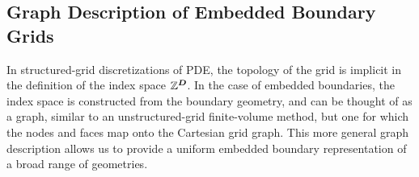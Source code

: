 \documentclass[12pt]{article}
\begin{document}

\subsection{Graph Description of Embedded Boundary Grids}

In structured-grid discretizations of PDE, the topology of the grid is implicit in the definition of the index space $\mathbb{Z}^{\boldsymbol{D}}$. In the case of embedded boundaries, the index space is constructed from the boundary geometry, and can be thought of as a graph, similar to an unstructured-grid finite-volume method, but one for which the nodes and faces map onto the Cartesian grid graph. This more general graph description allows us to provide a uniform embedded boundary representation of a broad range of geometries.  
\end{document}
